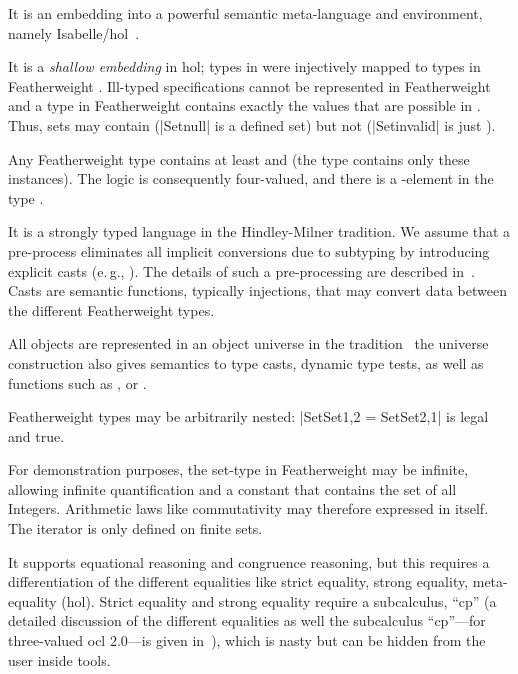 \documentclass[11pt,a4paper,openright,twoside,abstracton]{scrreprt}
\newcommand{\eg}{e.\,g.\xspace}
\begin{document}
\begin{compactenum}
\item It is an embedding into a powerful semantic meta-language and
  environment, namely
  Isabelle/\acs{hol}~\cite{nipkow.ea:isabelle:2002}.
\item It is a \emph{shallow embedding} in \acs{hol}; types
  in \OCL were injectively mapped to types in Featherweight
  \OCL. Ill-typed \OCL specifications cannot be represented in
  Featherweight \OCL and a type in Featherweight \OCL contains exactly
  the values that are possible in \OCL. Thus, sets may contain
   (\inlineocl|Set{null}| is a defined set) but not
   (\inlineocl|Set{invalid}| is just
  ).
\item Any Featherweight \OCL type contains at least
   and  (the type 
  contains only these instances). The logic is consequently
  four-valued, and there is a -element in the type
  .
\item It is a strongly typed language in the Hindley-Milner tradition.
  We assume that a pre-process eliminates all implicit conversions due
  to subtyping by introducing explicit casts (\eg,
  ). The details of such a pre-processing are
  described in~\cite{brucker:interactive:2007}.  Casts are semantic
  functions, typically injections, that may convert data between the
  different Featherweight \OCL types.
\item All objects are represented in an object universe in the \holocl
  tradition~\cite{brucker.ea:extensible:2008-b} the universe
  construction also gives semantics to type casts, dynamic type
  tests, as well as functions such as ,
  or .
\item Featherweight \OCL types may be arbitrarily nested:
  \inlineocl|Set{Set{1,2}} = Set{Set{2,1}}| is legal and true.
\item For demonstration purposes, the set-type in Featherweight \OCL
  may be infinite, allowing infinite quantification and a constant
  that contains the set of all Integers.  Arithmetic laws like
  commutativity may therefore expressed in \OCL itself.  The
  iterator is only defined on finite sets.
\item It supports equational reasoning and congruence reasoning, but
  this requires a differentiation of the different equalities like
  strict equality, strong equality, meta-equality (\acs{hol}). Strict
  equality and strong equality require a subcalculus, ``cp'' (a
  detailed discussion of the different equalities as well the
  subcalculus ``cp''---for three-valued \acs{ocl} 2.0---is given
  in~\cite{brucker.ea:semantics:2009}), which is nasty but can be
  hidden from the user inside tools.
\end{compactenum}
\end{document}
